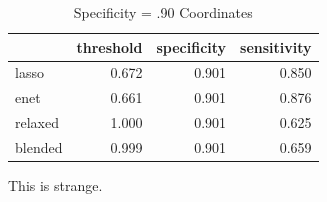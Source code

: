 \documentclass[
]{book}
\begin{document}
\begin{table}

\caption{\label{tab:brcaRna-glmnetFit-thresh90}Specificity = .90 Coordinates}
\centering
\begin{tabular}[t]{l|r|r|r}
\hline
  & threshold & specificity & sensitivity\\
\hline
lasso & 0.672 & 0.901 & 0.850\\
\hline
enet & 0.661 & 0.901 & 0.876\\
\hline
relaxed & 1.000 & 0.901 & 0.625\\
\hline
blended & 0.999 & 0.901 & 0.659\\
\hline
\end{tabular}
\end{table}

This is strange.
\end{document}
